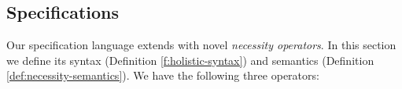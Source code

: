 



\subsection {\Nec Specifications}
\label{s:holistic-guarantees}

Our \Nec specification language extends \SpecO with novel 
 \emph{necessity operators}.
In this section we define its syntax (Definition \ref{f:holistic-syntax}) and semantics 
(Definition \ref{def:necessity-semantics}).
We have the following three operators:
 



